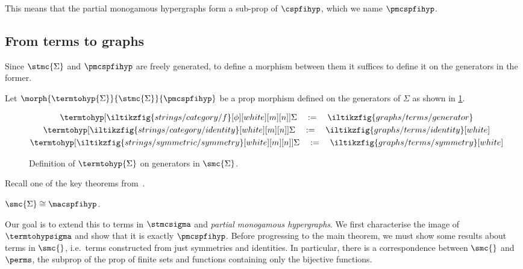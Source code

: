 \noindent
This means that the partial monogamous hypergraphs form a sub-prop of
\(\cspfihyp\), which we name \(\pmcspfihyp\).

\subsection{From terms to graphs}

Since \(\stmc{\Sigma}\) and \(\pmcspfihyp\) are freely generated, to define a
morphism between them it suffices to define it on the generators in the former.

\begin{definition}
    Let \(\morph{\termtohyp{\Sigma}}{\stmc{\Sigma}}{\pmcspfihyp}\) be a prop
    morphism defined on the generators of \(\Sigma\) as shown in
    \cref{fig:termtohyp}.
    \begin{figure}
        \begin{gather*}
            \termtohyp[\iltikzfig{strings/category/f}[\phi][white][m][n]]{\Sigma}
            \quad
            :=
            \quad
            \iltikzfig{graphs/terms/generator} \\
            \termtohyp[\iltikzfig{strings/category/identity}[white][m][n]]{\Sigma}
            \quad
            :=
            \quad \iltikzfig{graphs/terms/identity}[white] \\
            \termtohyp[\iltikzfig{strings/symmetric/symmetry}[white][m][n]]{\Sigma}
            \quad
            :=
            \quad
            \iltikzfig{graphs/terms/symmetry}[white]
        \end{gather*}
        \caption{Definition of \(\termtohyp{\Sigma}\) on generators in \(\smc{\Sigma}\).}
        \label{fig:termtohyp}
    \end{figure}
\end{definition}

\noindent
Recall one of the key theorems from~\cite{bonchi2021string}.

\begin{theorem}\label{thm:smc-graph-iso}
    \(\smc{\Sigma} \cong \macspfihyp\).
\end{theorem}

\noindent
Our goal is to extend this to terms in \(\stmcsigma\) and
\emph{partial monogamous hypergraphs}.
We first characterise the image of \(\termtohypsigma\) and show that it is
exactly \(\pmcspfihyp\).
Before progressing to the main theorem, we must show some results about terms in
\(\smc{}\), i.e.\ terms constructed from just symmetries and identities.
In particular, there is a correspondence between \(\smc{}\) and \(\perms\), the
subprop of the prop of finite sets and functions containing only the bijective
functions.


